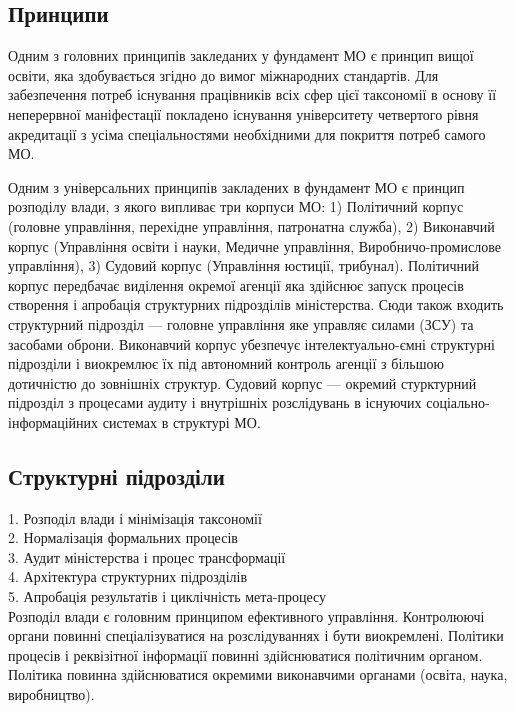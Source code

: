 \subsection{Принципи}

Одним з головних принципів закледаних у фундамент МО є принцип вищої освіти, яка здобувається згідно до вимог міжнародних стандартів. Для забезпечення потреб існування працівників всіх сфер цієї таксономії в основу її неперервної маніфестації покладено існування університету четвертого рівня акредитації з усіма спеціальностями необхідними для покриття потреб самого МО.

Одним з універсальних принципів закладених в фундамент МО є принцип розподілу влади, з якого випливає три корпуси МО: 1) Політичний корпус (головне управління, перехідне управління, патронатна служба), 2) Виконавчий корпус (Управління освіти і науки, Медичне управління, Виробничо-промислове управління), 3) Судовий корпус (Управління юстиції, трибунал). Політичний корпус передбачає виділення окремої агенції яка здійснює запуск процесів створення і апробація структурних підрозділів міністерства. Сюди також входить структурний підрозділ — головне управління яке управляє силами (ЗСУ) та засобами оброни. Виконавчий корпус убезпечує інтелектуально-ємні структурні підрозділи і виокремлює їх під автономний контроль агенції з більшою дотичністю до зовнішніх структур. Судовий корпус — окремий стурктурний підрозділ з процесами аудиту і внутрішніх розслідувань в існуючих соціально-інформаційних системах в структурі МО.

\newpage
\subsection{Структурні підрозділи}

1. Розподіл влади і мінімізація таксономії \\
2. Нормалізація формальних процесів \\
3. Аудит міністерства і процес трансформації \\
4. Архітектура структурних підрозділів \\
5. Апробація результатів і циклічність мета-процесу \\

Розподіл влади є головним принципом ефективного управління. Контролюючі
органи повинні спеціалізуватися на розслідуваннях і бути виокремлені.
Політики процесів і реквізітної інформації повинні здійснюватися політичним
органом. Політика повинна здійснюватися окремими виконавчими
органами (освіта, наука, виробництво).

